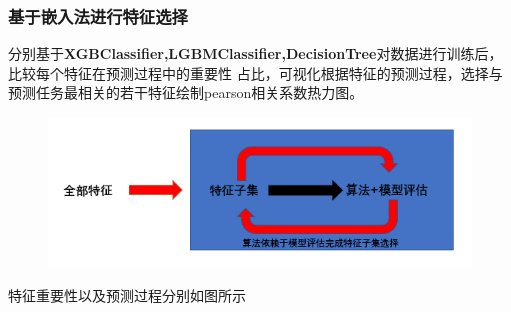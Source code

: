 \documentclass[12pt, a4paper, oneside]{ctexart}
\begin{document}
\subsubsection{基于嵌入法进行特征选择}
分别基于\textbf{XGBClassifier,LGBMClassifier,DecisionTree}对数据进行训练后，比较每个特征在预测过程中的重要性
占比，可视化根据特征的预测过程，选择与预测任务最相关的若干特征绘制pearson相关系数热力图。
\begin{figure}[htbp]
    \centering
	\includegraphics[width=1\textwidth]{./img/14.png}
\end{figure}
特征重要性以及预测过程分别如图所示
\begin{figure}[h!]
    \\
    \label{wildlife}
\end{figure}
\end{document}
